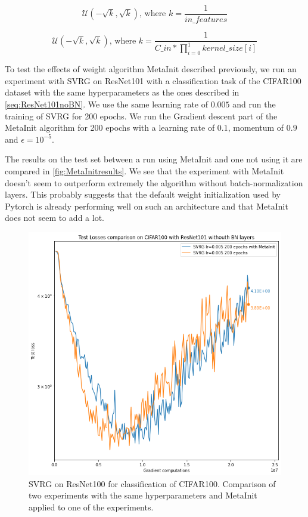 \documentclass[a4paper,11pt,oneside]{report}
\begin{document}
\begin{equation}\label{eq:initLinearLayers}
    \mathcal{U}(-\sqrt{k}, \sqrt{k}) \text{, where } k = \frac{1}{in\_features}
\end{equation}

\begin{equation}\label{eq:initConv2dLayers}
    \mathcal{U}(-\sqrt{k}, \sqrt{k}) \text{, where }
    k = \frac{1}{C\_in * \prod_{i=0}^{1}kernel\_size[i]} 
\end{equation}

To test the effects of weight algorithm MetaInit described previously, we run an experiment with SVRG on ResNet101 with a classification task of the CIFAR100 dataset with the same hyperparameters as the ones described in \autoref{seq:ResNet101noBN}. We use the same learning rate of $0.005$ and run the training of SVRG for 200 epochs. We run the Gradient descent part of the MetaInit algorithm for 200 epochs with a learning rate of $0.1$, momentum of $0.9$ and $\epsilon = 10^{-5}$.  

The results on the test set between a run using MetaInit and one not using it are compared in \autoref{fig:MetaInitresults}. We see that the experiment with MetaInit doesn't seem to outperform extremely the algorithm without batch-normalization layers. This probably suggests that the default weight initialization used by Pytorch is already performing well on such an architecture and that MetaInit does not seem to add a lot. 

\begin{figure}
    \centering
    \includegraphics[width=\columnwidth]{figures/MetaInitresults.png}
    \caption{SVRG on ResNet100 for classification of CIFAR100. Comparison of two experiments with the same hyperparameters and MetaInit applied to one of the experiments.}
    \label{fig:MetaInitresults}
\end{figure}
\end{document}
